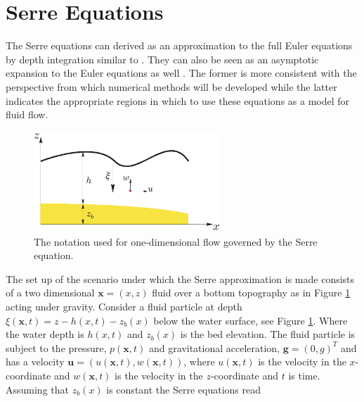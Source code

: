 \documentclass[SingleSpace,12pt]{Serre_ASCE}
\begin{document}
\section{Serre Equations}
\label{section:Serre Equations}
The Serre equations can derived as an approximation to the full Euler equations by depth integration similar to \cite{Su-Gardener-1969-536}. They can also be seen as an asymptotic expansion to the Euler equations as well \cite{Bonneton-Lannes-2009-16601}. The former is more consistent with the perspective from which numerical methods will be developed while the latter indicates the appropriate regions in which to use these equations as a model for fluid flow.
\begin{figure}[htb]
\begin{center}
\includegraphics[width=7.0cm]{one-dimensional-axis_Serre.eps}
\end{center}
\caption{The notation used for one-dimensional flow governed by the Serre equation.}
\label{fig:Notation}
\end{figure}
The set up of the scenario under which the Serre approximation is made consists of a two dimensional $\textbf{x} = (x,z)$ fluid over a bottom topography as in Figure \ref{fig:Notation} acting under gravity. Consider a fluid particle at depth  $\xi(\textbf{x},t) = z - h(x,t) - z_b(x)$ below the water surface, see Figure \ref{fig:Notation}. Where the water depth is $h(x,t)$ and $z_b(x)$ is the bed elevation. The fluid particle is subject to the pressure, $p(\textbf{x},t)$ and  gravitational acceleration, $\textbf{g} = (0,g)^T$ and has a velocity $\textbf{u} = (u(\textbf{x},t),w(\textbf{x},t))$,  where $u(\textbf{x},t)$ is the velocity in the $x$-coordinate and $w(\textbf{x},t)$ is the velocity in the $z$-coordinate and $t$ is time. Assuming that $z_b(x)$ is constant the Serre equations read \cite{Guyenne-etal-2014-169}
\end{document}
